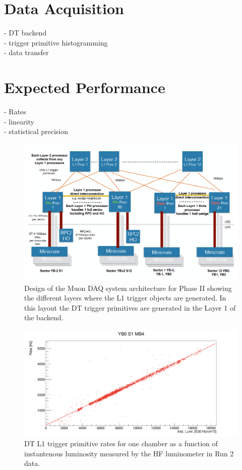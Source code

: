 \section{Data Acquisition}
- DT backend \\
- trigger primitive histogramming \\
- data transfer



\section{Expected Performance}
- Rates \\ 
- linearity \\
- statistical precision 



\begin{figure}[hbtp]
\centering
\includegraphics[width=.65\linewidth]{tex/Part2/fig/DT/DT-DAQoverview.png}
\caption{Design  of the Muon DAQ system architecture for Phase II showing the different layers where the L1 trigger objects are generated. In  this layout the DT trigger primitives are generated in the Layer 1 of the backend.}   
\label{fig:DT_DAQ}
\end{figure}



\begin{figure}[hbtp]
\centering
\includegraphics[width=.7\linewidth]{tex/Part2/fig/DT/DT-Linearity.png}
\caption{DT L1 trigger primitive rates for one chamber  as a function of instantenous luminosity measured by the HF luminometer in Run 2 data.} 
\label{fig:DT_linearity}
\end{figure}


